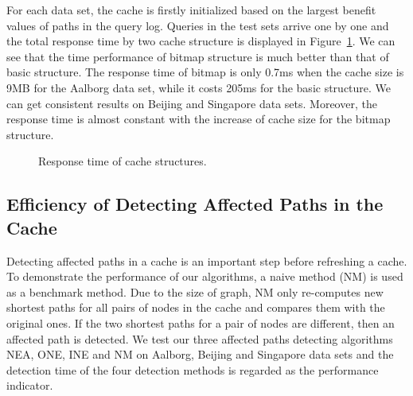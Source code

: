 For each data set, the cache is firstly initialized based on the largest benefit values of paths in the query log. Queries in the test sets arrive one by one and the total response time by two cache structure is displayed in Figure~\ref{fig:time-cache-structure}. We can see that the time performance of bitmap structure is much better than that of basic structure. The response time of bitmap is only 0.7ms when the cache size is 9MB for the Aalborg data set, while it costs 205ms for the basic structure. We can get consistent results on Beijing and Singapore data sets.
Moreover, the response time is almost constant with the increase of cache size for the bitmap structure.
\begin{figure}[htbp]
\centering
 \caption{Response time of cache structures.}
 \label{fig:time-cache-structure}
\end{figure}


\subsection{Efficiency of Detecting Affected Paths in the Cache}
\label{ssec:efficiency-detecting}
Detecting affected paths in a cache is an important step before refreshing a cache. To demonstrate the performance of our algorithms, a naive method (NM) is used as a benchmark method. Due to the size of graph, NM only re-computes new shortest paths for all pairs of nodes in the cache and compares them with the original ones. If the two shortest paths for a pair of nodes are different, then an affected path is detected.
We test our three affected paths detecting algorithms NEA, ONE, INE and NM on Aalborg, Beijing and Singapore data sets and the detection time of the four detection methods is regarded as the performance indicator.

